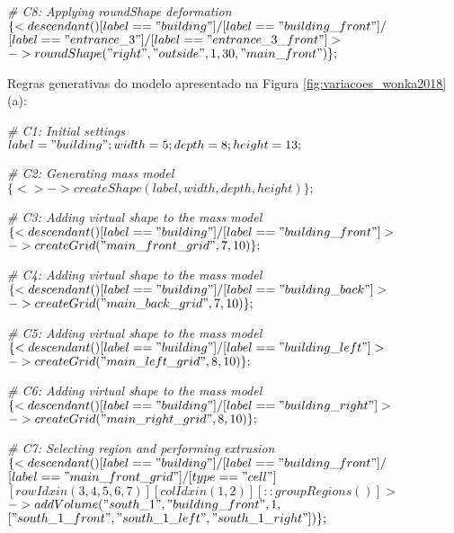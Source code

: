\noindent \textit{\# C8: Applying roundShape deformation} \\
$\{< descendant() [label=="building"] / [label=="building\_front"] / $\\
$[label=="entrance\_3"] / [label=="entrance\_3\_front"] > $\\
$-> roundShape("right", "outside", 1, 30, "main\_front")\};$

\vspace{1cm}

Regras generativas do modelo apresentado na Figura \ref{fig:variacoes_wonka2018}(a):

\noindent \textit{\# C1: Initial settings} \\
$label = "building"; width = 5; depth = 8; height = 13;$

\noindent \textit{\# C2: Generating mass model} \\
$\{<> -> createShape(label, width, depth, height)\};$

\noindent \textit{\# C3: Adding virtual shape to the mass model} \\
$\{< descendant() [label=="building"] / [label=="building\_front"] > $\\
$-> createGrid("main\_front\_grid", 7, 10)\};$

\noindent \textit{\# C4: Adding virtual shape to the mass model} \\
$\{< descendant() [label=="building"] / [label=="building\_back"] > $\\
$-> createGrid("main\_back\_grid", 7, 10)\};$

\noindent \textit{\# C5: Adding virtual shape to the mass model} \\
$\{< descendant() [label=="building"] / [label=="building\_left"] > $\\
$-> createGrid("main\_left\_grid", 8, 10)\};$

\noindent \textit{\# C6: Adding virtual shape to the mass model} \\
$\{< descendant() [label=="building"] / [label=="building\_right"] > $\\
$-> createGrid("main\_right\_grid", 8, 10)\};$

\noindent \textit{\# C7: Selecting region and performing extrusion} \\
$\{< descendant() [label=="building"] / [label=="building\_front"] / $\\
$[label=="main\_front\_grid"] / [type=="cell"] $\\
$[rowIdx in (3, 4, 5, 6, 7)] [colIdx in (1, 2)] [::groupRegions()] > $\\
$-> addVolume("south\_1", "building\_front", 1, $\\
$["south\_1\_front", "south\_1\_left", "south\_1\_right"])\};$

